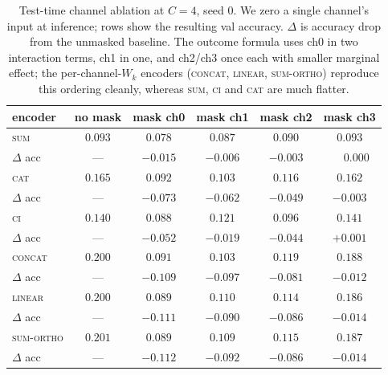 \begin{table}[t]
\centering
\caption{Test-time channel ablation at $C{=}4$, seed 0. We zero a single
channel's input at inference; rows show the resulting val accuracy.
$\Delta$ is accuracy drop from the unmasked baseline. The outcome formula
uses ch0 in two interaction terms, ch1 in one, and ch2/ch3 once each with
smaller marginal effect; the per-channel-$W_k$ encoders (\textsc{concat},
\textsc{linear}, \textsc{sum-ortho}) reproduce this ordering cleanly,
whereas \textsc{sum}, \textsc{ci} and \textsc{cat} are much flatter.}
\label{tab:mask}
\begin{tabular}{lccccc}
\toprule
encoder & no mask & mask ch0 & mask ch1 & mask ch2 & mask ch3 \\
\midrule
\textsc{sum}       & $0.093$ & $0.078$ & $0.087$ & $0.090$ & $0.093$ \\
$\Delta$ acc       &   ---   & $-0.015$ & $-0.006$ & $-0.003$ & $\phantom{-}0.000$ \\
\textsc{cat}       & $0.165$ & $0.092$ & $0.103$ & $0.116$ & $0.162$ \\
$\Delta$ acc       &   ---   & $-0.073$ & $-0.062$ & $-0.049$ & $-0.003$ \\
\textsc{ci}        & $0.140$ & $0.088$ & $0.121$ & $0.096$ & $0.141$ \\
$\Delta$ acc       &   ---   & $-0.052$ & $-0.019$ & $-0.044$ & $+0.001$ \\
\textsc{concat}    & $0.200$ & $0.091$ & $0.103$ & $0.119$ & $0.188$ \\
$\Delta$ acc       &   ---   & $-0.109$ & $-0.097$ & $-0.081$ & $-0.012$ \\
\textsc{linear}    & $0.200$ & $0.089$ & $0.110$ & $0.114$ & $0.186$ \\
$\Delta$ acc       &   ---   & $-0.111$ & $-0.090$ & $-0.086$ & $-0.014$ \\
\textsc{sum-ortho} & $0.201$ & $0.089$ & $0.109$ & $0.115$ & $0.187$ \\
$\Delta$ acc       &   ---   & $-0.112$ & $-0.092$ & $-0.086$ & $-0.014$ \\
\bottomrule
\end{tabular}
\end{table}
